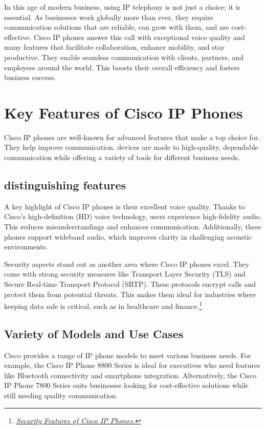 \documentclass[11pt,a4paper]{article}
\begin{document}
In this age of modern business, using IP telephony is not just a choice; it is essential. As businesses work globally more than ever, they require communication solutions that are reliable, can grow with them, and are cost-effective. Cisco IP phones answer this call with exceptional voice quality and many features that facilitate collaboration, enhance mobility, and stay productive. They enable seamless communication with clients, partners, and employees around the world. This boosts their overall efficiency and fosters business success.

\section*{Key Features of Cisco IP Phones}

Cisco IP phones are well-known for advanced features that make a top choice for. They help improve communication. devices are made to high-quality, dependable communication while offering a variety of tools for different business needs.

\subsection*{distinguishing features}

A key highlight of Cisco IP phones is their excellent voice quality. Thanks to Cisco's high-definition (HD) voice technology, users experience high-fidelity audio. This reduces misunderstandings and enhances communication. Additionally, these phones support wideband audio, which improves clarity in challenging acoustic environments.

Security aspects stand out as another area where Cisco IP phones excel. They come with strong security measures like Transport Layer Security (TLS) and Secure Real-time Transport Protocol (SRTP). These protocols encrypt calls and protect them from potential threats. This makes them ideal for industries where keeping data safe is critical, such as in healthcare and finance.\footnote{\href{https://www.cisco.com/c/dam/en/us/products/collateral/collaboration-endpoints/unified-ip-phone-8800-series/white-paper-c11-739097.pdf}{\textit{Security Features of Cisco IP Phones.}}}


\subsection*{Variety of Models and Use Cases}

Cisco provides a range of IP phone models to meet various business needs. For example, the Cisco IP Phone 8800 Series is ideal for executives who need features like Bluetooth connectivity and smartphone integration. Alternatively, the Cisco IP Phone 7800 Series suits businesses looking for cost-effective solutions while still needing quality communication.
\end{document}
